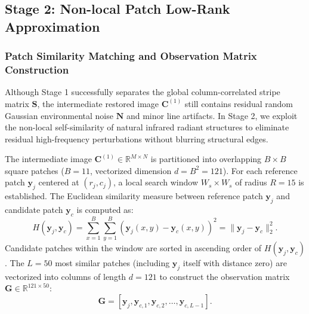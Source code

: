 
\subsection{Stage 2: Non-local Patch Low-Rank Approximation}
\label{subsec:stage2_patch_lowrank}

\subsubsection{Patch Similarity Matching and Observation Matrix Construction}
Although Stage 1 successfully separates the global column-correlated stripe matrix $\mathbf{S}$, the intermediate restored image $\mathbf{C}^{(1)}$ still contains residual random Gaussian environmental noise $\mathbf{N}$ and minor line artifacts. In Stage 2, we exploit the non-local self-similarity of natural infrared radiant structures to eliminate residual high-frequency perturbations without blurring structural edges.

The intermediate image $\mathbf{C}^{(1)} \in \mathbb{R}^{M \times N}$ is partitioned into overlapping $B \times B$ square patches ($B = 11$, vectorized dimension $d = B^2 = 121$). For each reference patch $\mathbf{y}_j$ centered at $(r_j, c_j)$, a local search window $W_s \times W_s$ of radius $R = 15$ is established. The Euclidean similarity measure between reference patch $\mathbf{y}_j$ and candidate patch $\mathbf{y}_c$ is computed as:
\begin{equation}
\label{eq:euclidean_patch_distance}
H(\mathbf{y}_j, \mathbf{y}_c) = \sum_{x=1}^B \sum_{y=1}^B (\mathbf{y}_j(x, y) - \mathbf{y}_c(x, y))^2 = \|\mathbf{y}_j - \mathbf{y}_c\|_2^2.
\end{equation}
Candidate patches within the window are sorted in ascending order of $H(\mathbf{y}_j, \mathbf{y}_c)$. The $L = 50$ most similar patches (including $\mathbf{y}_j$ itself with distance zero) are vectorized into columns of length $d = 121$ to construct the observation matrix $\mathbf{G} \in \mathbb{R}^{121 \times 50}$:
\begin{equation}
\label{eq:observation_matrix_g}
\mathbf{G} = [\mathbf{y}_j, \mathbf{y}_{c,1}, \mathbf{y}_{c,2}, \dots, \mathbf{y}_{c,L-1}].
\end{equation}


